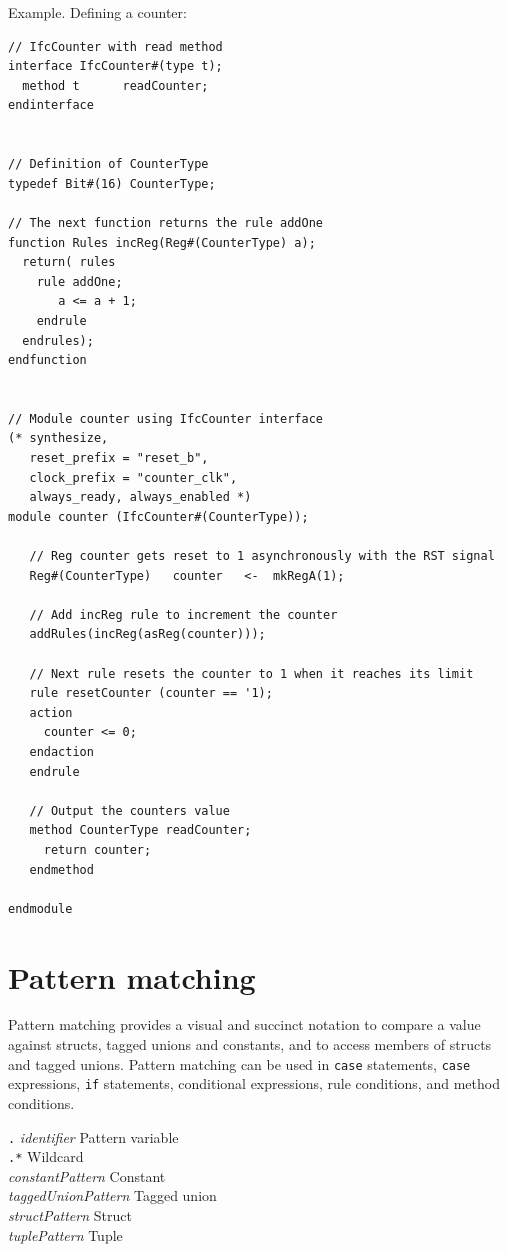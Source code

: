 \documentclass[twoside,letterpaper]{article}
\newcommand{\hm}{\hspace*{1em}}
\newcommand{\nterm}[1]{\emph{#1}}
\newcommand{\term}[1]{\texttt{#1}}
\newcommand{\alt}{{$\mid$}}
\newcommand{\gram}[2]{    \hm\makebox[10em][l]{\it #1}\makebox[1.5em][l]{::=}    #2}
\newcommand{\gramalt}[1]{ \hm\makebox[10em][l]{      }\makebox[1.5em][l]{\alt}   #1}
\begin{document}
Example. Defining a counter:
\begin{verbatim}
// IfcCounter with read method
interface IfcCounter#(type t);
  method t      readCounter;
endinterface


// Definition of CounterType
typedef Bit#(16) CounterType;

// The next function returns the rule addOne
function Rules incReg(Reg#(CounterType) a);
  return( rules
    rule addOne;
       a <= a + 1;
    endrule
  endrules);
endfunction


// Module counter using IfcCounter interface
(* synthesize,
   reset_prefix = "reset_b",
   clock_prefix = "counter_clk",
   always_ready, always_enabled *)
module counter (IfcCounter#(CounterType));

   // Reg counter gets reset to 1 asynchronously with the RST signal
   Reg#(CounterType)   counter   <-  mkRegA(1);

   // Add incReg rule to increment the counter
   addRules(incReg(asReg(counter)));

   // Next rule resets the counter to 1 when it reaches its limit
   rule resetCounter (counter == '1);
   action
     counter <= 0;
   endaction
   endrule

   // Output the counters value
   method CounterType readCounter;
     return counter;
   endmethod

endmodule
\end{verbatim}



\section{Pattern matching}

\label{sec-patterns}

Pattern matching provides a visual and succinct notation to compare a
value against structs, tagged unions and constants, and to access
members of structs and tagged unions.  Pattern matching can be used in
\texttt{case} statements, \texttt{case} expressions, \texttt{if} statements,
conditional expressions, rule conditions, and method conditions.

\gram{pattern}{ \term{.} \nterm{identifier} }    \hfill Pattern variable \\
\gramalt      { \term{.*} }                      \hfill Wildcard \\
\gramalt      { \nterm{constantPattern} }        \hfill Constant \\
\gramalt      { \nterm{taggedUnionPattern} }     \hfill Tagged union \\
\gramalt      { \nterm{structPattern} }          \hfill Struct \\
\gramalt      { \nterm{tuplePattern} }           \hfill Tuple
\end{document}
